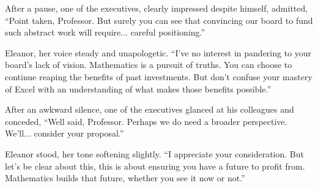 \smallskip

After a pause, one of the executives, clearly impressed despite himself, admitted, “Point taken, Professor. But surely you can see that convincing our board to fund such abstract work will require... careful positioning.”

\smallskip

Eleanor, her voice steady and unapologetic. “I’ve no interest in pandering to your board’s lack of vision. Mathematics is a pursuit of truths. You can choose to continue reaping the benefits of past investments. But don’t confuse your mastery of Excel with an understanding of what makes those benefits possible.”

\smallskip

After an awkward silence, one of the executives glanced at his colleagues and conceded, “Well said, Professor. Perhaps we do need a broader perspective. We’ll... consider your proposal.”

\smallskip

Eleanor stood, her tone softening slightly. “I appreciate your consideration. But let’s be clear about this, this is about ensuring you have a future to profit from. Mathematics builds that future, whether you see it now or not.”


